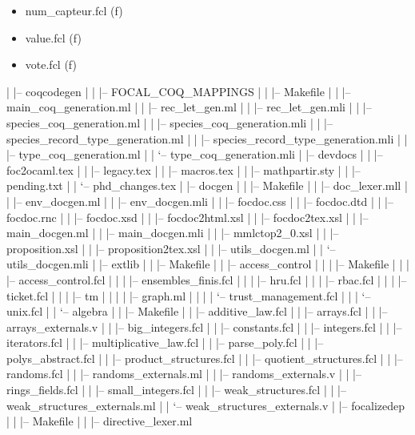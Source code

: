 \begin{itemize}
\begin{itemize}
\begin{itemize}
\begin{itemize}
              \item {num\_capteur.fcl} (f)
              \item {value.fcl} (f)
              \item {vote.fcl} (f)
            \end{itemize}
         \end{itemize}
|   |-- coqcodegen
|   |   |-- FOCAL\_COQ\_MAPPINGS
|   |   |-- Makefile
|   |   |-- main\_coq\_generation.ml
|   |   |-- rec\_let\_gen.ml
|   |   |-- rec\_let\_gen.mli
|   |   |-- species\_coq\_generation.ml
|   |   |-- species\_coq\_generation.mli
|   |   |-- species\_record\_type\_generation.ml
|   |   |-- species\_record\_type\_generation.mli
|   |   |-- type\_coq\_generation.ml
|   |   `-- type\_coq\_generation.mli
|   |-- devdocs
|   |   |-- foc2ocaml.tex
|   |   |-- legacy.tex
|   |   |-- macros.tex
|   |   |-- mathpartir.sty
|   |   |-- pending.txt
|   |   `-- phd\_changes.tex
|   |-- docgen
|   |   |-- Makefile
|   |   |-- doc\_lexer.mll
|   |   |-- env\_docgen.ml
|   |   |-- env\_docgen.mli
|   |   |-- focdoc.css
|   |   |-- focdoc.dtd
|   |   |-- focdoc.rnc
|   |   |-- focdoc.xsd
|   |   |-- focdoc2html.xsl
|   |   |-- focdoc2tex.xsl
|   |   |-- main\_docgen.ml
|   |   |-- main\_docgen.mli
|   |   |-- mmlctop2\_0.xsl
|   |   |-- proposition.xsl
|   |   |-- proposition2tex.xsl
|   |   |-- utils\_docgen.ml
|   |   `-- utils\_docgen.mli
|   |-- extlib
|   |   |-- Makefile
|   |   |-- access\_control
|   |   |   |-- Makefile
|   |   |   |-- access\_control.fcl
|   |   |   |-- ensembles\_finis.fcl
|   |   |   |-- hru.fcl
|   |   |   |-- rbac.fcl
|   |   |   |-- ticket.fcl
|   |   |   |-- tm
|   |   |   |   |-- graph.ml
|   |   |   |   `-- trust\_management.fcl
|   |   |   `-- unix.fcl
|   |   `-- algebra
|   |       |-- Makefile
|   |       |-- additive\_law.fcl
|   |       |-- arrays.fcl
|   |       |-- arrays\_externals.v
|   |       |-- big\_integers.fcl
|   |       |-- constants.fcl
|   |       |-- integers.fcl
|   |       |-- iterators.fcl
|   |       |-- multiplicative\_law.fcl
|   |       |-- parse\_poly.fcl
|   |       |-- polys\_abstract.fcl
|   |       |-- product\_structures.fcl
|   |       |-- quotient\_structures.fcl
|   |       |-- randoms.fcl
|   |       |-- randoms\_externals.ml
|   |       |-- randoms\_externals.v
|   |       |-- rings\_fields.fcl
|   |       |-- small\_integers.fcl
|   |       |-- weak\_structures.fcl
|   |       |-- weak\_structures\_externals.ml
|   |       `-- weak\_structures\_externals.v
|   |-- focalizedep
|   |   |-- Makefile
|   |   |-- directive\_lexer.ml

\end{itemize}
\end{itemize}
